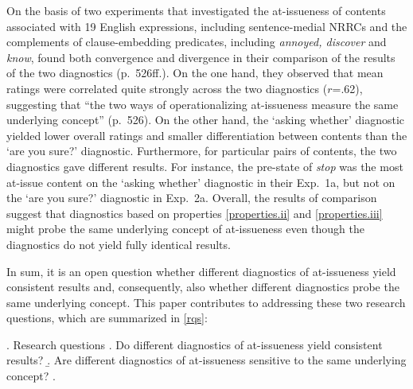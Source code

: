 \documentclass[times,linguex]{glossa}
\begin{document}


On the basis of two experiments that investigated the at-issueness of contents associated with 19 English expressions, including sentence-medial NRRCs and the complements of clause-embedding predicates, including \emph{annoyed, discover} and \emph{know}, \citet{tonhauser_how_2018} found both convergence and divergence in their comparison of the results of the two diagnostics (p.~526ff.). On the one hand, they observed that mean ratings were correlated quite strongly across the two diagnostics ($r$=.62), suggesting that ``the two ways of operationalizing at-issueness measure the same underlying concept'' (p.~526). On the other hand, the `asking whether' diagnostic yielded lower overall ratings and smaller differentiation between contents than the `are you sure?' diagnostic. Furthermore, for particular pairs of contents, the two diagnostics  gave different results. For instance, the pre-state of \emph{stop} was the most at-issue content on the `asking whether' diagnostic in their Exp.~1a, but not on the `are you sure?' diagnostic in Exp.~2a. Overall, the results of  comparison suggest that diagnostics based on properties \ref{properties.ii} and \ref{properties.iii} might probe the same underlying concept of at-issueness even though the diagnostics do not yield fully identical results.

In sum, it is an open question whether different diagnostics of at-issueness yield consistent results and, consequently, also whether different diagnostics probe the same underlying concept. This paper contributes to addressing these two research questions, which are summarized in \ref{rqs}:

\ex.\label{rqs} Research questions
\a.\label{rqa} Do different diagnostics of at-issueness yield consistent results?
\b.\label{rqb} Are different diagnostics of at-issueness sensitive to the same underlying concept?
\z.
\end{document}
